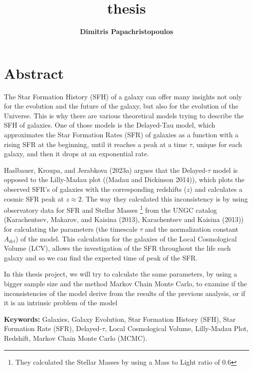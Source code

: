 \documentclass[
]{article}
\title{thesis}
\author{\textbf{Dimitris Papachristopoulos}\\}
\date{}
\renewcommand*\contentsname{Table of contents}
\newcommand\contentsname{Table of contents}
\begin{document}
\maketitle

\renewcommand*\contentsname{Table of contents}
{
\hypersetup{linkcolor=}
\setcounter{tocdepth}{3}
\tableofcontents
}

\newpage{}

\section{Abstract}\label{abstract}

The Star Formation History (SFH) of a galaxy can offer many insights not
only for the evolution and the future of the galaxy, but also for the
evolution of the Universe. This is why there are various theoretical
models trying to describe the SFH of galaxies. One of those models is
the Delayed-Tau model, which approximates the Star Formation Rates (SFR)
of galaxies as a function with a rising SFR at the beginning, until it
reaches a peak at a time \(\tau\), unique for each galaxy, and then it
drops at an exponential rate.

Haslbauer, Kroupa, and Jerabkova (2023a) argues that the
Delayed-\(\tau\) model is opposed to the Lilly-Madau plot ((Madau and
Dickinson 2014)), which plots the observed SFR's of galaxies with the
corresponding redshifts (\(z\)) and calculates a cosmic SFR peak at
\(z\approx 2\). The way they calculated this inconsistency is by using
observatory data for SFR and Stellar Masses \footnote{They calculated
  the Stellar Masses by using a Mass to Light ratio of 0.6} from the
UNGC catalog (Karachentsev, Makarov, and Kaisina (2013), Karachentsev
and Kaisina (2013)) for calculating the parameters (the timescale
\(\tau\) and the normalization constant \(A_{del}\)) of the model. This
calculation for the galaxies of the Local Cosmological Volume (LCV),
allows the investigation of the SFR throughout the life each galaxy and
so we can find the expected time of peak of the SFR.

In this thesis project, we will try to calculate the same parameters, by
using a bigger sample size and the method Markov Chain Monte Carlo, to
examine if the inconsistencies of the model derive from the results of
the previous analysis, or if it is an intrinsic problem of the model

\textbf{Keywords:} Galaxies, Galaxy Evolution, Star Formation History
(SFH), Star Formation Rate (SFR), Delayed-\(\tau\), Local Cosmological
Volume, Lilly-Madau Plot, Redshift, Markov Chain Monte Carlo (MCMC).
\end{document}
